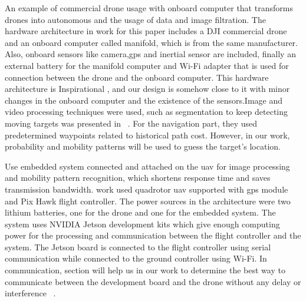 \documentclass[../main.tex]{subfiles}
\begin{document}

	An example of commercial drone usage with onboard computer that transforms drones into 
	autonomous and the usage of data and image filtration.
	The hardware architecture in \citeauthor{Wang18} work for this paper includes a DJI 
	commercial drone and an onboard computer called manifold, which is from the same manufacturer.
	 Also, onboard sensors like camera,\gls{gps} and inertial sensor are included, finally an 
	 external battery for the manifold computer and Wi-Fi adapter that is used for connection 
	 between the drone and the onboard computer. This hardware architecture is Inspirational
	 , and our design is somehow close to it with minor changes in the onboard computer and 
	 the existence of the sensors.Image and video processing techniques were used, such as 
	 segmentation to keep detecting moving targets was presented in ~\cite{Wang18}.
	For the navigation part, they used predetermined waypoints related to historical path cost. 
	However, in our work, probability and mobility patterns will be used to guess the target's location.

	Use embedded system connected and attached on the \gls{uav} for image processing and mobility
	 pattern recognition, which shortens response time and saves transmission bandwidth. 
	\citeauthor{Zhao18} work used quadrotor \gls{uav} supported with \gls{gps} module and Pix 
	Hawk flight controller. The power sources in the architecture were two lithium batteries, 
	one for the drone and one for the embedded system. The system uses	NVIDIA Jetson development
	 kits which give enough computing power for the processing and communication between the flight 
	 controller and the system. The Jetson board is connected to the flight controller using serial 
	 communication while connected to the ground controller using Wi-Fi. In communication, section
	  will help us in our work to determine the best way to communicate between the development 
	  board and the drone without any delay or interference ~\cite{Zhao18}. 



\end{document}
